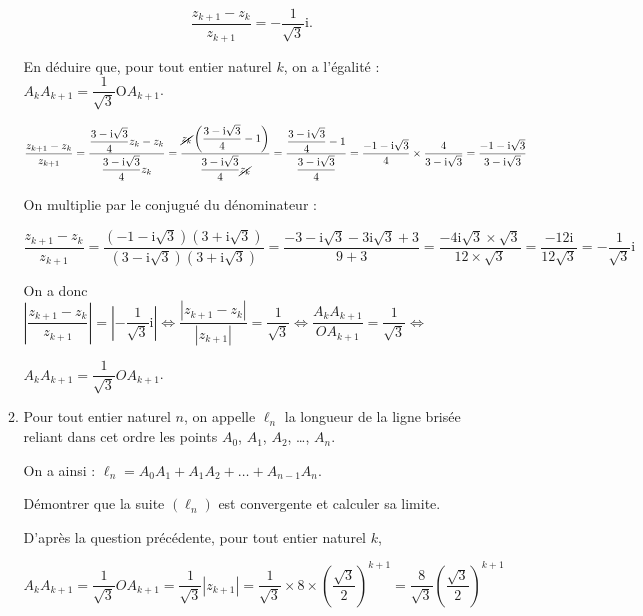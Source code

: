\documentclass{cornouaille}
\begin{document}
\begin{exercice}
\begin{enumerate}
\begin{enumerate}
		\[\dfrac{z_{k+1} - z_{k}}{z_{k+1}} = - \dfrac{1}{\sqrt{3}}\text{i}.\]

En déduire que, pour tout entier naturel $k$, on a l'égalité : $A_kA_{k+1} = \dfrac{1}{\sqrt{3}} \text{O}A_{k+1}$.

\begin{solution}
$\dfrac{z_{k+1} - z_k}{z_{k+1} } = \dfrac{ \dfrac{3-\text{i}\sqrt{3}}{4}z_k - z_k}{ \dfrac{3-\text{i}\sqrt{3}}{4}z_k } = \dfrac{ \cancel{z_k} \left( \dfrac{3-\text{i}\sqrt{3}}{4} - 1 \right)}{ \dfrac{3-\text{i}\sqrt{3}}{4}\cancel{z_k} } 
		=\dfrac{ \dfrac{3-\text{i}\sqrt{3}}{4} - 1 }{\dfrac{3-\text{i}\sqrt{3}}{4}}
		= \dfrac{ -1-\text{i}\sqrt{3} }{4} \times \dfrac{4}{3-\text{i}\sqrt{3}} 
		= \dfrac{ -1-\text{i}\sqrt{3} }{3-\text{i}\sqrt{3}}$\medskip 
		
On multiplie par le conjugué du dénominateur :\smallskip 
		
$\dfrac{z_{k+1} - z_k}{z_{k+1}}
		=\dfrac{ (-1-\text{i}\sqrt{3})(3+\text{i}\sqrt{3}) }{ (3-\text{i}\sqrt{3})(3+\text{i}\sqrt{3})} 
		= \dfrac{-3-\text{i}\sqrt{3}-3\text{i}\sqrt{3}+3 }{9+3} = \dfrac{-4\text{i}\sqrt{3}\times \sqrt{3} }{12 \times \sqrt{3} } = \dfrac{-12\text{i}}{12\sqrt{3}} = - \dfrac{1}{\sqrt{3}} \text{i}$\medskip 
		
On a donc $\left|\dfrac{z_{k+1} - z_k}{z_{k+1} }\right| = \left|- \dfrac{1}{\sqrt{3}} \text{i}\right|
		\iff \dfrac{\left|z_{k+1} - z_k \right|}{\left|z_{k+1} \right|} = \dfrac{1}{\sqrt{3}} 
		\iff \dfrac{A_kA_{k+1}}{OA_{k+1}} = \dfrac{1}{\sqrt{3}}
		\iff $
		
$A_kA_{k+1} = \dfrac{1}{\sqrt{3}} OA_{k+1}$.
\end{solution}
		\item Pour tout entier naturel $n$, on appelle $\ell_n$ la longueur de la ligne brisée reliant dans cet ordre les points $A_0$,\: $A_1$,\: $A_2$, \ldots , $A_n$.
		
On a ainsi : $\ell_n = A_0A_1 + A_1A_2 + \ldots + A_{n-1}A_n$.
		
Démontrer que la suite $\left(\ell_n\right)$ est convergente et calculer sa limite.

\begin{solution}
D'après la question précédente, pour tout entier naturel $k$,\smallskip 
		
$A_kA_{k+1} = \dfrac{1}{\sqrt{3}} OA_{k+1} = \dfrac{1}{\sqrt{3}} \left|z_{k+1} \right| = \dfrac{1}{\sqrt{3}} \times 8 \times \left( \dfrac{\sqrt{3}}{2} \right)^{k+1} = \dfrac{8}{\sqrt{3}} \left( \dfrac{\sqrt{3}}{2} \right)^{k+1}$ \medskip 
		

\end{solution}
\end{enumerate}
\end{enumerate}
\end{exercice}
\end{document}
